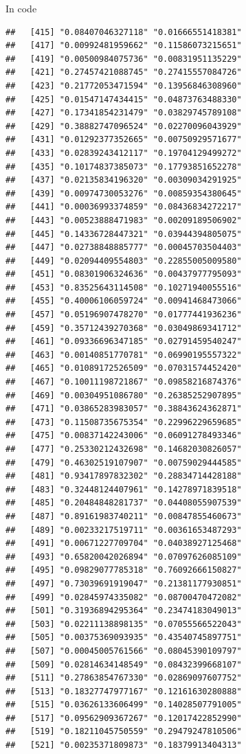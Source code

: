 \documentclass[ignorenonframetext,]{beamer}
\begin{document}
\begin{frame}[fragile]{In code}
\begin{verbatim}
##   [415] "0.08407046327118" "0.01666551418381"
##   [417] "0.00992481959662" "0.11586073215651"
##   [419] "0.00500984075736" "0.00831951135229"
##   [421] "0.27457421088745" "0.27415557084726"
##   [423] "0.21772053471594" "0.13956846308960"
##   [425] "0.01547147434415" "0.04873763488330"
##   [427] "0.17341854231479" "0.03829745789108"
##   [429] "0.38882747096524" "0.02270096043929"
##   [431] "0.01292377352665" "0.00750929571677"
##   [433] "0.02839243412117" "0.19704129499272"
##   [435] "0.10174837385073" "0.17793851652278"
##   [437] "0.02135834196320" "0.00309034291925"
##   [439] "0.00974730053276" "0.00859354380645"
##   [441] "0.00036993374859" "0.08436834272217"
##   [443] "0.00523888471983" "0.00209189506902"
##   [445] "0.14336728447321" "0.03944394805075"
##   [447] "0.02738848885777" "0.00045703504403"
##   [449] "0.02094409554803" "0.22855005009580"
##   [451] "0.08301906324636" "0.00437977795093"
##   [453] "0.83525643114508" "0.10271940055516"
##   [455] "0.40006106059724" "0.00941468473066"
##   [457] "0.05196907478270" "0.01777441936236"
##   [459] "0.35712439270368" "0.03049869341712"
##   [461] "0.09336696347185" "0.02791459540247"
##   [463] "0.00140851770781" "0.06990195557322"
##   [465] "0.01089172526509" "0.07031574452420"
##   [467] "0.10011198721867" "0.09858216874376"
##   [469] "0.00304951086780" "0.26385252907895"
##   [471] "0.03865283983057" "0.38843624362871"
##   [473] "0.11508735675354" "0.22996229659685"
##   [475] "0.00837142243006" "0.06091278493346"
##   [477] "0.25330212432698" "0.14682030826057"
##   [479] "0.46302519107907" "0.00759029444585"
##   [481] "0.93417897832302" "0.28834714428188"
##   [483] "0.32448124407961" "0.14278971839518"
##   [485] "0.20484848281737" "0.04408055907539"
##   [487] "0.89161983740211" "0.00847855460673"
##   [489] "0.00233217519711" "0.00361653487293"
##   [491] "0.00671227709704" "0.04038927125468"
##   [493] "0.65820042026894" "0.07097626085109"
##   [495] "0.09829077785318" "0.76092666150827"
##   [497] "0.73039691919047" "0.21381177930851"
##   [499] "0.02845974335082" "0.08700470472082"
##   [501] "0.31936894295364" "0.23474183049013"
##   [503] "0.02211138898135" "0.07055566522043"
##   [505] "0.00375369093935" "0.43540745897751"
##   [507] "0.00045005761566" "0.08045390109797"
##   [509] "0.02814634148549" "0.08432399668107"
##   [511] "0.27863854767330" "0.02869097607752"
##   [513] "0.18327747977167" "0.12161630280888"
##   [515] "0.03626133606499" "0.14028507791005"
##   [517] "0.09562909367267" "0.12017422852990"
##   [519] "0.18211045750559" "0.29479247810506"
##   [521] "0.00235371809873" "0.18379913404313"

\end{verbatim}
\end{frame}
\end{document}
